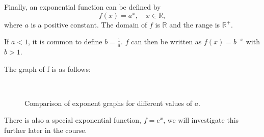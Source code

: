 Finally, an exponential function can be defined by
\begin{equation*}
f(x)=a^x,\quad x\in\mathbb{R},
\end{equation*}
where $a$ is a positive constant. The domain of $f$ is $\mathbb{R}$ and the range is $\mathbb{R}^+$. 

If \(a<1\), it is common to define \(b=\frac{1}{a}\). \(f\) can then be written as \(f(x)=b^{-x}\) with \(b>1\).

The graph of f is as follows:

\begin{figure}[H]
    \hspace{0.2cm}
    \hspace{2.0cm}
     \\
    \centering
  \caption{Comparison of exponent graphs for different values of $a$.}
  \label{fig:exponent-graphs}
\end{figure}

There is also a special exponential function, $f=e^x$, we will investigate this further later in the course.


%
